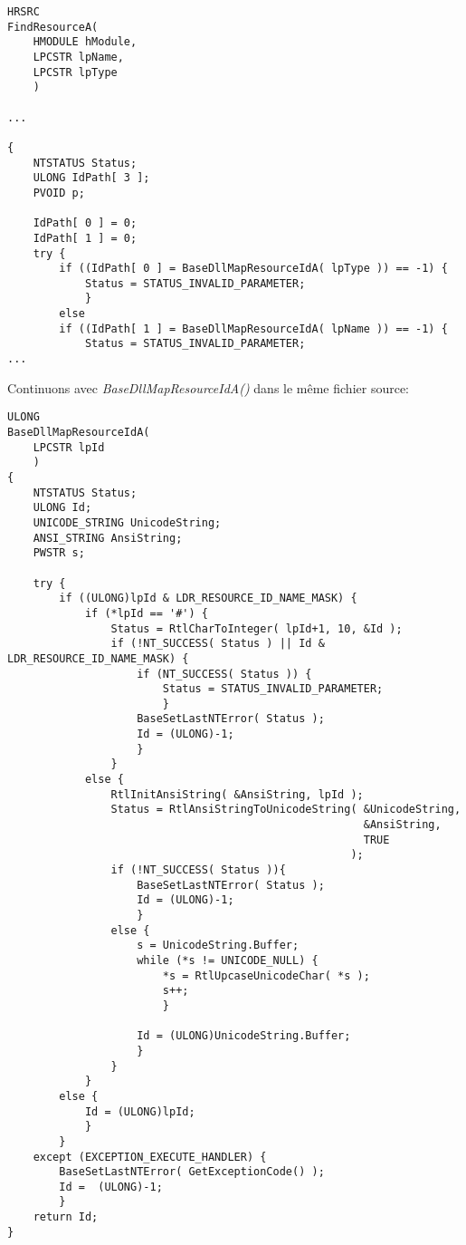 \begin{lstlisting}[style=customc]
HRSRC
FindResourceA(
    HMODULE hModule,
    LPCSTR lpName,
    LPCSTR lpType
    )

...

{
    NTSTATUS Status;
    ULONG IdPath[ 3 ];
    PVOID p;

    IdPath[ 0 ] = 0;
    IdPath[ 1 ] = 0;
    try {
        if ((IdPath[ 0 ] = BaseDllMapResourceIdA( lpType )) == -1) {
            Status = STATUS_INVALID_PARAMETER;
            }
        else
        if ((IdPath[ 1 ] = BaseDllMapResourceIdA( lpName )) == -1) {
            Status = STATUS_INVALID_PARAMETER;
...
\end{lstlisting}

Continuons avec \emph{BaseDllMapResourceIdA()} dans le même fichier source:

\begin{lstlisting}[style=customc]
ULONG
BaseDllMapResourceIdA(
    LPCSTR lpId
    )
{
    NTSTATUS Status;
    ULONG Id;
    UNICODE_STRING UnicodeString;
    ANSI_STRING AnsiString;
    PWSTR s;

    try {
        if ((ULONG)lpId & LDR_RESOURCE_ID_NAME_MASK) {
            if (*lpId == '#') {
                Status = RtlCharToInteger( lpId+1, 10, &Id );
                if (!NT_SUCCESS( Status ) || Id & LDR_RESOURCE_ID_NAME_MASK) {
                    if (NT_SUCCESS( Status )) {
                        Status = STATUS_INVALID_PARAMETER;
                        }
                    BaseSetLastNTError( Status );
                    Id = (ULONG)-1;
                    }
                }
            else {
                RtlInitAnsiString( &AnsiString, lpId );
                Status = RtlAnsiStringToUnicodeString( &UnicodeString,
                                                       &AnsiString,
                                                       TRUE
                                                     );
                if (!NT_SUCCESS( Status )){
                    BaseSetLastNTError( Status );
                    Id = (ULONG)-1;
                    }
                else {
                    s = UnicodeString.Buffer;
                    while (*s != UNICODE_NULL) {
                        *s = RtlUpcaseUnicodeChar( *s );
                        s++;
                        }

                    Id = (ULONG)UnicodeString.Buffer;
                    }
                }
            }
        else {
            Id = (ULONG)lpId;
            }
        }
    except (EXCEPTION_EXECUTE_HANDLER) {
        BaseSetLastNTError( GetExceptionCode() );
        Id =  (ULONG)-1;
        }
    return Id;
}
\end{lstlisting}

